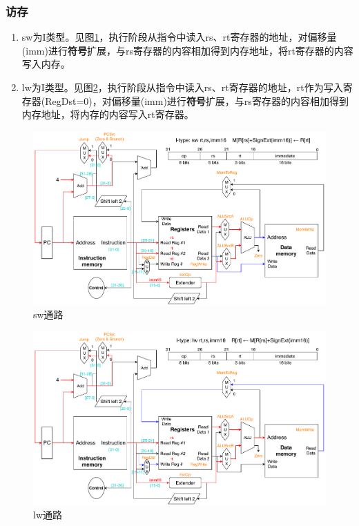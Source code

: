 \subsubsection{访存}
\begin{enumerate}
	\item sw为I类型。见图\ref{fig:datapath_sw}，执行阶段从指令中读入rs、rt寄存器的地址，对偏移量(imm)进行\textbf{符号}扩展，与rs寄存器的内容相加得到内存地址，将rt寄存器的内容写入内存。
	\item lw为I类型。见图\ref{fig:datapath_lw}，执行阶段从指令中读入rs、rt寄存器的地址，rt作为写入寄存器(RegDst=0)，对偏移量(imm)进行\textbf{符号}扩展，与rs寄存器的内容相加得到内存地址，将内存的内容写入rt寄存器。
\end{enumerate}
\begin{figure}[htbp]
\centering
\includegraphics[width=\linewidth]{fig/Datapath_sw.pdf}
\caption{sw通路}
\label{fig:datapath_sw}
\end{figure}
\begin{figure}[htbp]
\centering
\includegraphics[width=\linewidth]{fig/Datapath_lw.pdf}
\caption{lw通路}
\label{fig:datapath_lw}
\end{figure}

